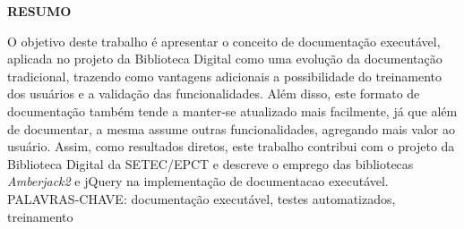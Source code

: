 \begin{center}
\textbf{RESUMO}
\end{center}
\singlespacing

\noindent O objetivo deste trabalho é apresentar o conceito de documentação executável, aplicada no projeto da Biblioteca Digital como uma evolução da documentação tradicional, trazendo como vantagens adicionais a possibilidade do treinamento dos usuários e a validação das funcionalidades. Além disso, este formato de documentação também tende a manter-se atualizado mais facilmente, já que além de documentar, a mesma assume outras funcionalidades, agregando mais valor ao usuário. Assim, como resultados diretos, este trabalho contribui com o projeto da Biblioteca Digital da SETEC/EPCT e descreve o emprego das bibliotecas \textit{Amberjack2} e jQuery na implementação de documentacao executável. \\

\noindent PALAVRAS-CHAVE: documentação executável, testes automatizados, treinamento
